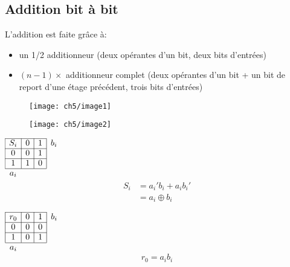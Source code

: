 \subsection{Addition bit à bit}
\label{subsec:addbitàbit}
L'addition est faite grâce à:
\begin{itemize}
	\item un 1/2 additionneur (deux opérantes d'un bit, deux bits d'entrées)
	\item $(n-1)\times$ additionneur complet (deux opérantes d'un bit + un bit de report d'une étage précédent, trois bits d'entrées)
\end{itemize}
\begin{minipage}{.45\textwidth}
	\begin{figure}[H]
		\centering
		\texttt{[image: ch5/image1]}
	\end{figure}
\end{minipage}
\begin{minipage}{.55\textwidth}
	\begin{figure}[H]
		\centering
		\texttt{[image: ch5/image2]}
	\end{figure}
\end{minipage}
\begin{minipage}[t]{.25\textwidth}
	\begin{table}[H]
		\centering
		$\begin{array}{|c|c|c|c}
			\cline{1-3}
			S_i & 0 & 1 & b_i\\
			\cline{1-3}
			0 & 0 & 1 & \\
			\cline{1-3}
			1 & 1 & 0 & \\
			\cline{1-3}
			\multicolumn{1}{c}{a_i} & \multicolumn{1}{c}{ } & \multicolumn{1}{c}{ }		
		\end{array}$
		\begin{align*}
			S_i &=a_i'b_i+a_ib_i'\\
			&= a_i  \oplus b_i
		\end{align*} 
	\end{table}

\end{minipage}
\begin{minipage}[t]{.2\textwidth}
	\begin{table}[H]
		\centering
		$\begin{array}{|c|c|c|c}
			\cline{1-3}
			r_0 & 0 & 1 & b_i\\
			\cline{1-3}
			0 & 0 & 0 & \\
			\cline{1-3}
			1 & 0 & 1 & \\
			\cline{1-3}
			\multicolumn{1}{c}{a_i} & \multicolumn{1}{c}{ } & \multicolumn{1}{c}{ }		
		\end{array}$
		\begin{equation*}
			r_0 = a_ib_i
		\end{equation*} 
	\end{table}
\end{minipage}
